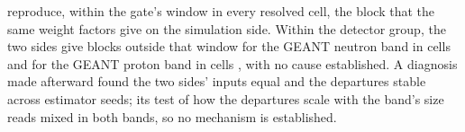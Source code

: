 reproduce, within the gate's window in every resolved cell, the block that the same weight factors give on the simulation side. Within the detector group, the two sides give blocks outside that window for the GEANT neutron band in cells  and for the GEANT proton band in cells , with no cause established. A diagnosis made afterward found the two sides' inputs equal and the departures stable across estimator seeds; its test of how the departures scale with the band's size reads mixed in both bands, so no mechanism is established.
